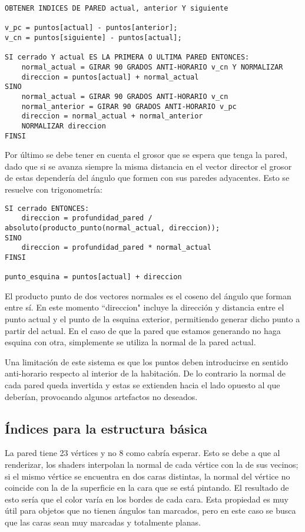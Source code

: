 \begin{lstlisting}
OBTENER INDICES DE PARED actual, anterior Y siguiente

v_pc = puntos[actual] - puntos[anterior];
v_cn = puntos[siguiente] - puntos[actual];

SI cerrado Y actual ES LA PRIMERA O ULTIMA PARED ENTONCES:
    normal_actual = GIRAR 90 GRADOS ANTI-HORARIO v_cn Y NORMALIZAR
    direccion = puntos[actual] + normal_actual
SINO
    normal_actual = GIRAR 90 GRADOS ANTI-HORARIO v_cn
    normal_anterior = GIRAR 90 GRADOS ANTI-HORARIO v_pc
    direccion = normal_actual + normal_anterior
    NORMALIZAR direccion
FINSI
\end{lstlisting}

Por último se debe tener en cuenta el grosor que se espera que tenga la pared, dado que si se avanza siempre la misma distancia en el vector director el grosor de estas dependería del ángulo que formen con sus paredes adyacentes. Esto se resuelve con trigonometría:

\begin{lstlisting}
SI cerrado ENTONCES:
    direccion = profundidad_pared / absoluto(producto_punto(normal_actual, direccion));
SINO
    direccion = profundidad_pared * normal_actual
FINSI

punto_esquina = puntos[actual] + direccion
\end{lstlisting}

El producto punto de dos vectores normales es el coseno del ángulo que forman entre sí. En este momento ``direccion" incluye la dirección y distancia entre el punto actual y el punto de la esquina exterior, permitiendo generar dicho punto a partir del actual. En el caso de que la pared que estamos generando no haga esquina con otra, simplemente se utiliza la normal de la pared actual.

Una limitación de este sistema es que los puntos deben introducirse en sentido anti-horario respecto al interior de la habitación. De lo contrario la normal de cada pared queda invertida y estas se extienden hacia el lado opuesto al que deberían, provocando algunos artefactos no deseados.

\subsection{Índices para la estructura básica}
La pared tiene 23 vértices y no 8 como cabría esperar. Esto se debe a que al renderizar, los shaders interpolan la normal de cada vértice con la de sus vecinos; si el mismo vértice se encuentra en dos caras distintas, la normal del vértice no coincide con la de la superficie en la cara que se está pintando. El resultado de esto sería que el color varía en los bordes de cada cara. Esta propiedad es muy útil para objetos que no tienen ángulos tan marcados, pero en este caso se busca que las caras sean muy marcadas y totalmente planas.

